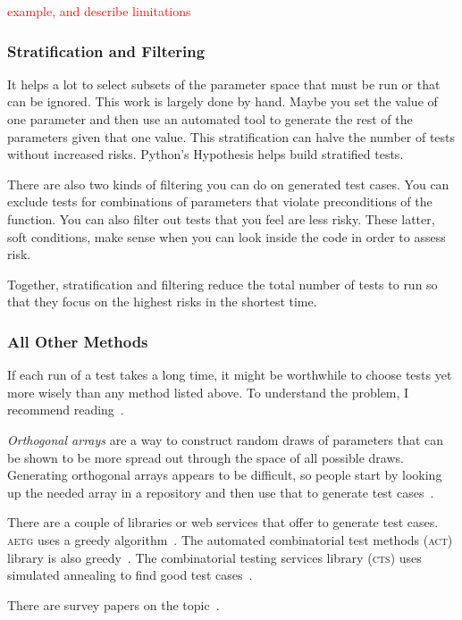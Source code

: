 \documentclass[fleqn,10pt]{olplainarticle}
\newcommand{\aside}[1]{\textcolor{red}{#1}}
\begin{document}
\aside{example, and describe limitations}


\subsubsection{Stratification and Filtering}
It helps a lot to select subsets of the parameter
space that must be run or that can be ignored. This work
is largely done by hand. Maybe you set the value of one parameter
and then use an automated tool to generate the rest of
the parameters given that one value. This stratification
can halve the number of tests without increased risks.
Python's Hypothesis helps build stratified tests.

There are also two kinds of filtering you can do on 
generated test cases. You can exclude tests for combinations
of parameters that violate preconditions of the function.
You can also filter out tests that you feel are less risky.
These latter, soft conditions, make sense when you can
look inside the code in order to assess risk.

Together, stratification and filtering reduce the total number
of tests to run so that they focus on the highest risks
in the shortest time.

\subsubsection{All Other Methods}
If each run of a test takes a long time, it might be worthwhile
to choose tests yet more wisely than any method listed above.
To understand the problem, I recommend reading~\citet{petke2015practical}.


\emph{Orthogonal arrays} are a way to construct random draws
of parameters that can be shown to be more spread out through
the space of all possible draws. Generating orthogonal arrays
appears to be difficult, so people start by looking up the
needed array in a repository and then use that to generate
test cases~\citep{Owen1992}.

There are a couple of libraries or web services that offer
to generate test cases. \textsc{aetg} uses a greedy algorithm~\citep{cohen1997aetg}.
The automated combinatorial test methods (\textsc{act}) library
is also greedy~\citep{kuhn2008automated}.
The combinatorial testing services library (\textsc{cts})
uses simulated annealing to find good test cases~\citep{hartman2004problems}.

There are survey papers on the topic~\citep{nie2011survey,khalsa2014orchestrated}.
\end{document}
